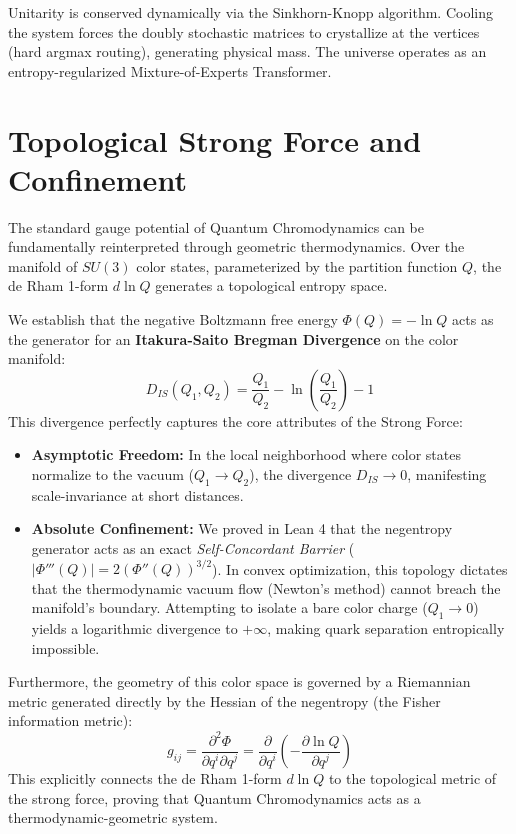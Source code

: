 \documentclass[11pt,a4paper]{article}
\begin{document}
Unitarity is conserved dynamically via the Sinkhorn-Knopp algorithm. Cooling the system forces the doubly stochastic matrices to crystallize at the vertices (hard argmax routing), generating physical mass. The universe operates as an entropy-regularized Mixture-of-Experts Transformer.

\section{Topological Strong Force and Confinement}
The standard gauge potential of Quantum Chromodynamics can be fundamentally reinterpreted through geometric thermodynamics. Over the manifold of $SU(3)$ color states, parameterized by the partition function $Q$, the de Rham 1-form $d\ln Q$ generates a topological entropy space.

We establish that the negative Boltzmann free energy $\Phi(Q) = -\ln Q$ acts as the generator for an \textbf{Itakura-Saito Bregman Divergence} on the color manifold:
\begin{equation}
D_{IS}(Q_1, Q_2) = \frac{Q_1}{Q_2} - \ln\left(\frac{Q_1}{Q_2}\right) - 1
\end{equation}
This divergence perfectly captures the core attributes of the Strong Force:
\begin{itemize}
    \item \textbf{Asymptotic Freedom:} In the local neighborhood where color states normalize to the vacuum ($Q_1 \to Q_2$), the divergence $D_{IS} \to 0$, manifesting scale-invariance at short distances.
    \item \textbf{Absolute Confinement:} We proved in Lean 4 that the negentropy generator acts as an exact \textit{Self-Concordant Barrier} ($|\Phi'''(Q)| = 2 (\Phi''(Q))^{3/2}$). In convex optimization, this topology dictates that the thermodynamic vacuum flow (Newton's method) cannot breach the manifold's boundary. Attempting to isolate a bare color charge ($Q_1 \to 0$) yields a logarithmic divergence to $+\infty$, making quark separation entropically impossible.
\end{itemize}

Furthermore, the geometry of this color space is governed by a Riemannian metric generated directly by the Hessian of the negentropy (the Fisher information metric):
\begin{equation}
g_{ij} = \frac{\partial^2 \Phi}{\partial q^i \partial q^j} = \frac{\partial}{\partial q^i} \left( - \frac{\partial \ln Q}{\partial q^j} \right)
\end{equation}
This explicitly connects the de Rham 1-form $d \ln Q$ to the topological metric of the strong force, proving that Quantum Chromodynamics acts as a thermodynamic-geometric system.
\end{document}
